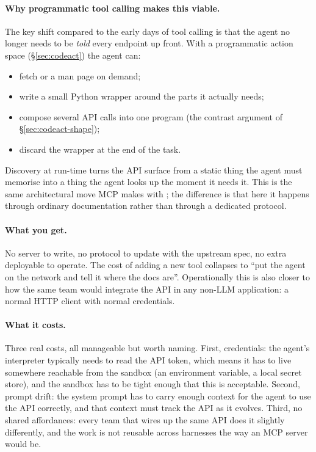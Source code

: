 \paragraph{Why programmatic tool calling makes this viable.}
The key shift compared to the early days of tool calling is that
the agent no longer needs to be \emph{told} every endpoint up
front. With a programmatic action space (\S\ref{sec:codeact}) the
agent can:

\begin{itemize}[leftmargin=1.5em,itemsep=0.2em]
\item fetch  or a man page on demand;
\item write a small Python wrapper around the parts it actually
  needs;
\item compose several API calls into one program (the contrast
  argument of \S\ref{sec:codeact-shape});
\item discard the wrapper at the end of the task.
\end{itemize}

Discovery at run-time turns the API surface from a static thing the
agent must memorise into a thing the agent looks up the moment it
needs it. This is the same architectural move MCP makes with
; the difference is that here it happens through
ordinary documentation rather than through a dedicated protocol.

\paragraph{What you get.}
No server to write, no protocol to update with the upstream spec,
no extra deployable to operate. The cost of adding a new tool
collapses to ``put the agent on the network and tell it where the
docs are''. Operationally this is also closer to how the same
team would integrate the API in any non-LLM application: a normal
HTTP client with normal credentials.

\paragraph{What it costs.}
Three real costs, all manageable but worth naming. First,
credentials: the agent's interpreter typically needs to read the
API token, which means it has to live somewhere reachable from the
sandbox (an environment variable, a local secret store), and the
sandbox has to be tight enough that this is acceptable. Second,
prompt drift: the system prompt has to carry enough context for
the agent to use the API correctly, and that context must track
the API as it evolves. Third, no shared affordances: every team
that wires up the same API does it slightly differently, and the
work is not reusable across harnesses the way an MCP server
would be.

